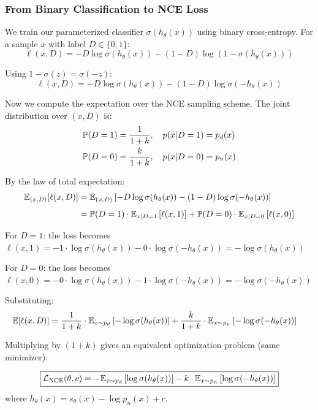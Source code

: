 \begin{notechapter}
\subsubsection{From Binary Classification to NCE Loss}

We train our parameterized classifier $\sigma(h_\theta(x))$ using binary cross-entropy. For a sample $x$ with label $D \in \{0, 1\}$:
\begin{equation}
\ell(x, D) = -D \log \sigma(h_\theta(x)) - (1-D) \log(1 - \sigma(h_\theta(x)))
\end{equation}

Using $1 - \sigma(z) = \sigma(-z)$:
\begin{equation}
\ell(x, D) = -D \log \sigma(h_\theta(x)) - (1-D) \log \sigma(-h_\theta(x))
\end{equation}

Now we compute the expectation over the NCE sampling scheme. The joint distribution over $(x, D)$ is:
\begin{align}
\mathbb{P}(D=1) &= \frac{1}{1+k}, \quad p(x|D=1) = p_d(x) \\
\mathbb{P}(D=0) &= \frac{k}{1+k}, \quad p(x|D=0) = p_n(x)
\end{align}

By the law of total expectation:
\begin{align}
\mathbb{E}_{(x,D)}[\ell(x, D)] &= \mathbb{E}_{(x,D)}\left[-D \log \sigma(h_\theta(x)) - (1-D) \log \sigma(-h_\theta(x))\right] \\[0.5em]
&= \mathbb{P}(D=1) \cdot \mathbb{E}_{x|D=1}\left[\ell(x, 1)\right] + \mathbb{P}(D=0) \cdot \mathbb{E}_{x|D=0}\left[\ell(x, 0)\right]
\end{align}

For $D=1$: the loss becomes $\ell(x, 1) = -1 \cdot \log \sigma(h_\theta(x)) - 0 \cdot \log \sigma(-h_\theta(x)) = -\log \sigma(h_\theta(x))$

For $D=0$: the loss becomes $\ell(x, 0) = -0 \cdot \log \sigma(h_\theta(x)) - 1 \cdot \log \sigma(-h_\theta(x)) = -\log \sigma(-h_\theta(x))$

Substituting:
\begin{align}
\mathbb{E}[\ell(x, D)] &= \frac{1}{1+k} \cdot \mathbb{E}_{x \sim p_d}\left[-\log \sigma(h_\theta(x))\right] + \frac{k}{1+k} \cdot \mathbb{E}_{x \sim p_n}\left[-\log \sigma(-h_\theta(x))\right]
\end{align}

Multiplying by $(1+k)$ gives an equivalent optimization problem (same minimizer):

\begin{definition}
\begin{equation}
\boxed{\mathcal{L}_{\text{NCE}}(\theta, c) = -\mathbb{E}_{x \sim p_d}\left[\log \sigma(h_\theta(x))\right] - k \cdot \mathbb{E}_{x \sim p_n}\left[\log \sigma(-h_\theta(x))\right]}
\end{equation}
where $h_\theta(x) = s_\theta(x) - \log p_n(x) + c$.
\end{definition}


\end{notechapter}

